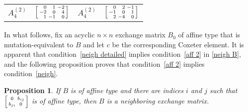 \documentclass{amsart}
\newtheorem{proposition}{Proposition}[section]
\theoremstyle{definition}
\theoremstyle{remark}
\numberwithin{equation}{section}
\newcommand{\0}{{\mathbf{0}}}
\renewcommand{\b}{\mathbf{b}}
\begin{document}
\begin{table}
\begin{tabular}{|cc|cc|}
	$A_{4}^{(2)}$ & $\begin{bsmallmatrix*}[r]
	0 & 1 & -2 \\
	-2 & 0 & 4 \\
	1 & -1 & 0
	\end{bsmallmatrix*}$ &
	$A_{4}^{(2)}$ & $\begin{bsmallmatrix*}[r]
	0 & 2 & -1 \\
	-1 & 0 & 1 \\
	2 & -4 & 0
	\end{bsmallmatrix*}$ 
	\end{tabular}
	\end{table}

In what follows, fix an acyclic $n\times n$ exchange matrix $B_0$ of affine type that is mutation-equivalent to $B$ and let $c$ be the corresponding Coxeter element.
It is apparent that condition~\eqref{neigh detailed} implies condition~\eqref{aff 2} in \cref{neigh B}, and the following proposition proves that condition~\eqref{aff 2} implies condition~\eqref{neigh}.
\begin{proposition}\label{aff 2 block}
If $B$ is of affine type and there are indices $i$ and $j$ such that $\begin{bsmallmatrix}0&b_{ij}\\b_{ji}&0\end{bsmallmatrix}$ is of affine type, then $B$ is a neighboring exchange matrix.
\end{proposition}
\end{document}
